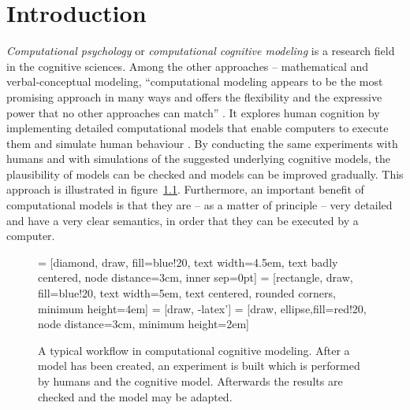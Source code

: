 \chapter{Introduction}

\emph{Computational psychology} or \emph{computational cognitive modeling} is a research field in the cognitive sciences. Among the other approaches -- mathematical and verbal-conceptual modeling, ``computational modeling appears to be the most promising approach in many ways and offers the flexibility and the expressive power that no other approaches can match'' \cite[vii]{sun_introduction_2008}. It explores human cognition by implementing detailed computational models that enable computers to execute them and simulate human behaviour \cite[3]{sun_introduction_2008}. By conducting the same experiments with humans and with simulations of the suggested underlying cognitive models, the plausibility of models can be checked and models can be improved gradually. This approach is illustrated in figure~\ref{fig:cognitive_modeling_exp}. Furthermore, an important benefit of computational models is that they are -- as a matter of principle -- very detailed and have a very clear semantics, in order that they can be executed by a computer. 

\begin{figure}[hbt]
\centering
 = [diamond, draw, fill=blue!20, 
    text width=4.5em, text badly centered, node distance=3cm, inner sep=0pt]
 = [rectangle, draw, fill=blue!20, 
    text width=5em, text centered, rounded corners, minimum height=4em]
 = [draw, -latex']
 = [draw, ellipse,fill=red!20, node distance=3cm,
    minimum height=2em]
    
\caption{A typical workflow in computational cognitive modeling. After a model has been created, an experiment is built which is performed by humans and the cognitive model. Afterwards the results are checked and the model may be adapted. \cite{about_actr_homepage}}
\label{fig:cognitive_modeling_exp}
\end{figure}


